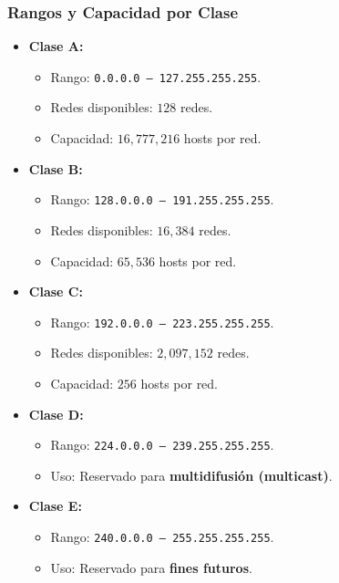 \documentclass[a4paper,12pt]{article}
\begin{document}
\subsubsection*{Rangos y Capacidad por Clase}
\begin{itemize}
    \item \textbf{Clase A:}
    \begin{itemize}
        \item Rango: \texttt{0.0.0.0 – 127.255.255.255}.
        \item Redes disponibles: \(128\) redes.
        \item Capacidad: \(16,777,216\) hosts por red.
    \end{itemize}

    \item \textbf{Clase B:}
    \begin{itemize}
        \item Rango: \texttt{128.0.0.0 – 191.255.255.255}.
        \item Redes disponibles: \(16,384\) redes.
        \item Capacidad: \(65,536\) hosts por red.
    \end{itemize}

    \item \textbf{Clase C:}
    \begin{itemize}
        \item Rango: \texttt{192.0.0.0 – 223.255.255.255}.
        \item Redes disponibles: \(2,097,152\) redes.
        \item Capacidad: \(256\) hosts por red.
    \end{itemize}

    \item \textbf{Clase D:}
    \begin{itemize}
        \item Rango: \texttt{224.0.0.0 – 239.255.255.255}.
        \item Uso: Reservado para \textbf{multidifusión (multicast)}.
    \end{itemize}

    \item \textbf{Clase E:}
    \begin{itemize}
        \item Rango: \texttt{240.0.0.0 – 255.255.255.255}.
        \item Uso: Reservado para \textbf{fines futuros}.
    \end{itemize}
\end{itemize}
\end{document}
